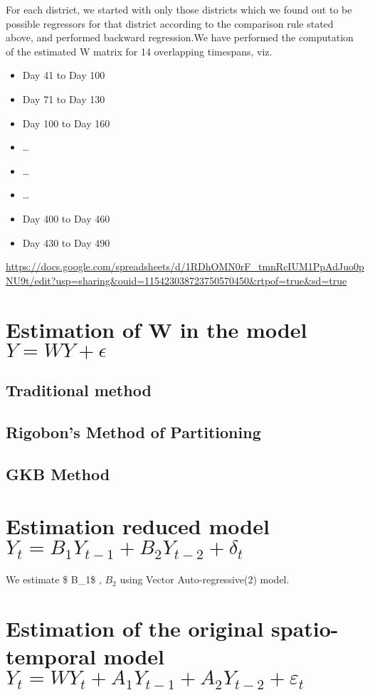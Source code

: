 \documentclass[
  12pt,
]{article}
\providecommand{\tightlist}{%
  \setlength{\itemsep}{0pt}\setlength{\parskip}{0pt}}
\begin{document}
For each district, we started with only those districts which we found
out to be possible regressors for that district according to the
comparison rule stated above, and performed backward regression.We have
performed the computation of the estimated W matrix for 14 overlapping
timespans, viz.~

\begin{itemize}
\tightlist
\item
  Day 41 to Day 100
\item
  Day 71 to Day 130
\item
  Day 100 to Day 160
\item
  \ldots{}
\item
  \ldots{}
\item
  \ldots{}
\item
  Day 400 to Day 460
\item
  Day 430 to Day 490
\end{itemize}

\url{https://docs.google.com/spreadsheets/d/1RDhOMN0rF_tmnRcIUM1PpAdJuo0pNU9t/edit?usp=sharing\&ouid=115423038723750570450\&rtpof=true\&sd=true}

\section{\textbf{\textcolor{DeepBlue}{Estimation of W in the model $ Y=WY +\epsilon $}}}
\subsection{Traditional method}

\subsection{Rigobon's Method of Partitioning}

\subsection{GKB Method}

\section{\textbf{\textcolor{DeepBlue}{Estimation reduced model $Y_t = B_1 Y_{t-1} + B_2 Y_{t-2} + \delta_t$}}}

We estimate \$ B\_1\$ , \(B_2\) using Vector Auto-regressive(2) model.

\section{\textbf{\textcolor{DeepBlue}{Estimation of the original spatio-temporal model $ Y_t = WY_t + A_1 Y_{t-1} + A_2 Y_{t-2} + \varepsilon_t $}}}
\end{document}
